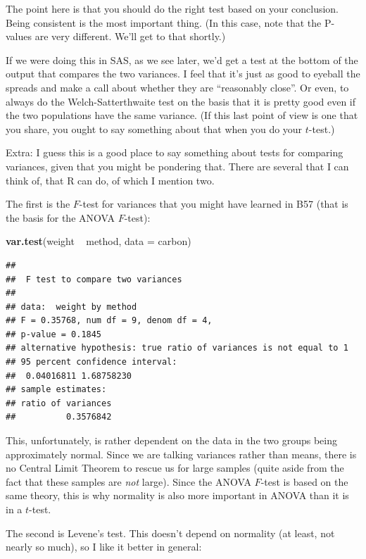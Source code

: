 \documentclass[]{tufte-book}
\newenvironment{Shaded}{}{}
\newcommand{\DataTypeTok}[1]{\textcolor[rgb]{0.56,0.13,0.00}{#1}}
\newcommand{\KeywordTok}[1]{\textcolor[rgb]{0.00,0.44,0.13}{\textbf{#1}}}
\newcommand{\NormalTok}[1]{#1}
\newcommand{\OperatorTok}[1]{\textcolor[rgb]{0.40,0.40,0.40}{#1}}
\newcommand{\StringTok}[1]{\textcolor[rgb]{0.25,0.44,0.63}{#1}}
\theoremstyle{definition}
\theoremstyle{definition}
\theoremstyle{definition}
\theoremstyle{remark}
\begin{document}
The point here is that you should do the right test based on your
conclusion. Being consistent is the most important thing. (In this case,
note that the P-values are very different. We'll get to that shortly.)

If we were doing this in SAS, as we see later, we'd get a test at the
bottom of the output that compares the two variances. I feel that it's
just as good to eyeball the spreads and make a call about whether they
are ``reasonably close''. Or even, to always do the Welch-Satterthwaite
test on the basis that it is pretty good even if the two populations
have the same variance. (If this last point of view is one that you
share, you ought to say something about that when you do your
\(t\)-test.)

Extra: I guess this is a good place to say something about tests for
comparing variances, given that you might be pondering that. There are
several that I can think of, that R can do, of which I mention two.

The first is the \(F\)-test for variances that you might have learned in
B57 (that is the basis for the ANOVA \(F\)-test):

\begin{Shaded}
\begin{Highlighting}[]
\KeywordTok{var.test}\NormalTok{(weight }\OperatorTok{~}\StringTok{ }\NormalTok{method, }\DataTypeTok{data =}\NormalTok{ carbon)}
\end{Highlighting}
\end{Shaded}

\begin{verbatim}
## 
##  F test to compare two variances
## 
## data:  weight by method
## F = 0.35768, num df = 9, denom df = 4,
## p-value = 0.1845
## alternative hypothesis: true ratio of variances is not equal to 1
## 95 percent confidence interval:
##  0.04016811 1.68758230
## sample estimates:
## ratio of variances 
##          0.3576842
\end{verbatim}

This, unfortunately, is rather dependent on the data in the two groups
being approximately normal. Since we are talking variances rather than
means, there is no Central Limit Theorem to rescue us for large samples
(quite aside from the fact that these samples are \emph{not} large).
Since the ANOVA \(F\)-test is based on the same theory, this is why
normality is also more important in ANOVA than it is in a \(t\)-test.

The second is Levene's test. This doesn't depend on normality (at least,
not nearly so much), so I like it better in general:
\end{document}
